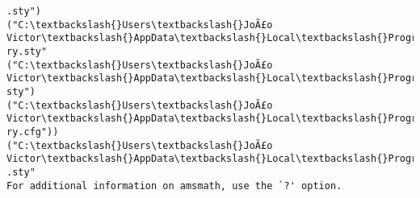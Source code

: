 \documentclass[11pt]{article}
\begin{document}
\begin{Verbatim}[commandchars=\\\{\}]
.sty")
("C:\textbackslash{}Users\textbackslash{}JoÃ£o Victor\textbackslash{}AppData\textbackslash{}Local\textbackslash{}Programs\textbackslash{}MiKTeX\textbackslash{}tex/latex/geometry\textbackslash{}geomet
ry.sty"
("C:\textbackslash{}Users\textbackslash{}JoÃ£o Victor\textbackslash{}AppData\textbackslash{}Local\textbackslash{}Programs\textbackslash{}MiKTeX\textbackslash{}tex/generic/iftex\textbackslash{}ifvtex.
sty")
("C:\textbackslash{}Users\textbackslash{}JoÃ£o Victor\textbackslash{}AppData\textbackslash{}Local\textbackslash{}Programs\textbackslash{}MiKTeX\textbackslash{}tex/latex/geometry\textbackslash{}geomet
ry.cfg"))
("C:\textbackslash{}Users\textbackslash{}JoÃ£o Victor\textbackslash{}AppData\textbackslash{}Local\textbackslash{}Programs\textbackslash{}MiKTeX\textbackslash{}tex/latex/amsmath\textbackslash{}amsmath
.sty"
For additional information on amsmath, use the `?' option.


\end{Verbatim}
\end{document}

